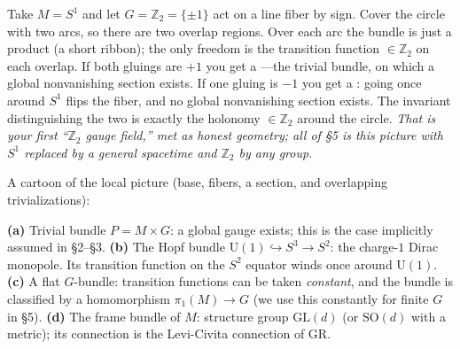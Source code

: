 \documentclass[11pt]{article}
\newcommand{\Uone}{\mathrm{U}(1)}
\newcommand{\Ztwo}{\mathbb{Z}_2}
\begin{document}
\begin{eexample}
Take $M=S^1$ and let $G=\Ztwo=\{\pm1\}$ act on a line fiber by sign. Cover the circle with
two arcs, so there are two overlap regions. Over each arc the bundle is just a product (a
short ribbon); the only freedom is the transition function $\in\Ztwo$ on each overlap. If
both gluings are $+1$ you get a ---the trivial bundle, on which a global
nonvanishing section exists. If one gluing is $-1$ you get a : going
once around $S^1$ flips the fiber, and no global nonvanishing section exists. The invariant
distinguishing the two is exactly the holonomy $\in\Ztwo$ around the circle. \emph{That is
your first ``$\Ztwo$ gauge field,'' met as honest geometry; all of \S5 is this picture
with $S^1$ replaced by a general spacetime and $\Ztwo$ by any group.}
\end{eexample}

A cartoon of the local picture (base, fibers, a section, and overlapping trivializations):

\begin{center}
\end{center}

\begin{eexample}
\textbf{(a)} Trivial bundle $P=M\times G$: a global gauge exists; this is the case
implicitly assumed in \S2--\S3. \textbf{(b)} The Hopf bundle
$\Uone\hookrightarrow S^3\to S^2$: the charge-$1$ Dirac monopole. Its transition
function on the $S^2$ equator winds once around $\Uone$. \textbf{(c)} A flat
$G$-bundle: transition functions can be taken \emph{constant}, and the bundle is
classified by a homomorphism $\pi_1(M)\to G$ (we use this constantly for finite $G$ in
\S5). \textbf{(d)} The frame bundle of $M$: structure group $\mathrm{GL}(d)$ (or
$\mathrm{SO}(d)$ with a metric); its connection is the Levi-Civita connection of GR.
\end{eexample}
\end{document}
